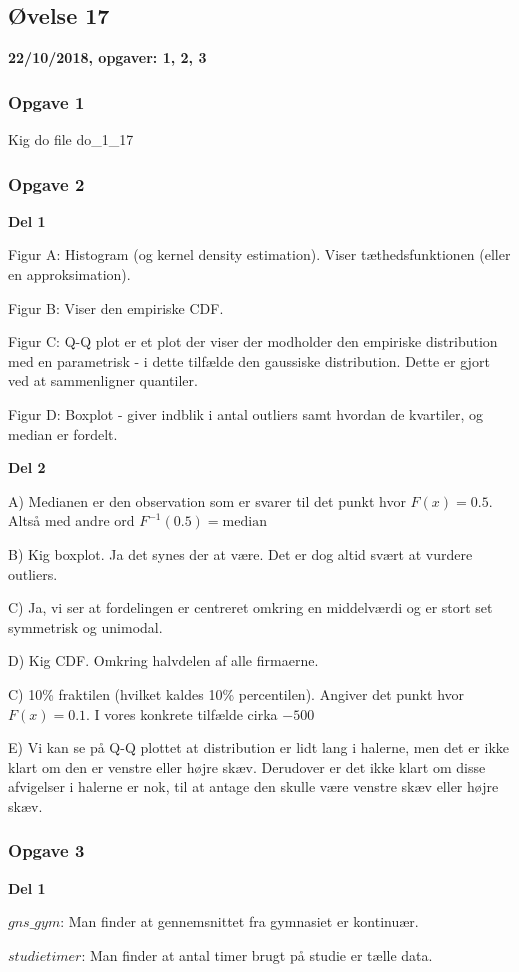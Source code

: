 \horizline

\subsection{Øvelse 17}

\textbf{22/10/2018, opgaver: 1, 2, 3}

\subsubsection{Opgave 1}

Kig do file do\_1\_17

\subsubsection{Opgave 2}

\textbf{Del 1}

Figur A: Histogram (og kernel density estimation). Viser tæthedsfunktionen (eller en approksimation).

Figur B: Viser den empiriske CDF.

Figur C: Q-Q plot er et plot der viser der modholder den empiriske distribution med en parametrisk - i dette tilfælde den gaussiske distribution. Dette er gjort ved at sammenligner quantiler.

Figur D: Boxplot - giver indblik i antal outliers samt hvordan de kvartiler, og median er fordelt.

\textbf{Del 2}

A) Medianen er den observation som er svarer til det punkt hvor $F(x) = 0.5$. Altså med andre ord $F^{-1}(0.5) =\text{median} $

B) Kig boxplot. Ja det synes der at være. Det er dog altid svært at vurdere outliers.

C) Ja, vi ser at fordelingen er centreret omkring en middelværdi og er stort set symmetrisk og unimodal.

D) Kig CDF. Omkring halvdelen af alle firmaerne.

C) 10\% fraktilen (hvilket kaldes 10\%  percentilen). Angiver det punkt hvor $F(x)= 0.1 $. I vores konkrete tilfælde cirka $- 500$

E) Vi kan se på Q-Q plottet at distribution er lidt lang i halerne, men det er ikke klart om den er venstre eller højre skæv. Derudover er det ikke klart om disse afvigelser i halerne er nok, til at antage den skulle være venstre skæv eller højre skæv.

\subsubsection{Opgave 3}

\textbf{Del 1}

$gns\_gym$: Man finder at gennemsnittet fra gymnasiet er kontinuær.

$studietimer$: Man finder at antal timer brugt på studie er tælle data.




